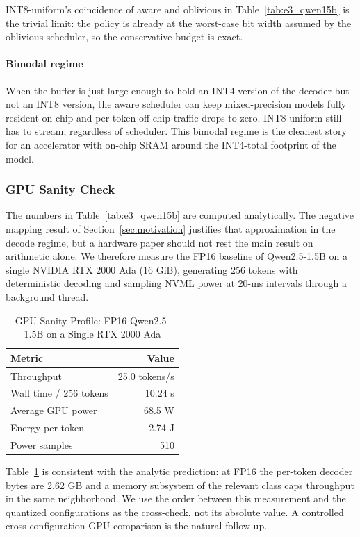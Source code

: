 \documentclass{ieeeaccess}
\begin{document}
INT8-uniform's coincidence of aware and oblivious in
Table~\ref{tab:e3_qwen15b} is the trivial limit: the policy is already
at the worst-case bit width assumed by the oblivious scheduler, so the
conservative budget is exact.

\paragraph{Bimodal regime}
When the buffer is just large enough to hold an INT4 version of the
decoder but not an INT8 version, the aware scheduler can keep
mixed-precision models fully resident on chip and per-token off-chip
traffic drops to zero. INT8-uniform still has to stream, regardless of
scheduler. This bimodal regime is the cleanest story for an
accelerator with on-chip SRAM around the INT4-total footprint of the
model.

\subsubsection{GPU Sanity Check}
The numbers in Table~\ref{tab:e3_qwen15b} are computed analytically.
The negative mapping result of Section~\ref{sec:motivation} justifies
that approximation in the decode regime, but a hardware paper should
not rest the main result on arithmetic alone. We therefore measure the
FP16 baseline of Qwen2.5-1.5B on a single NVIDIA RTX 2000 Ada (16 GiB),
generating 256 tokens with deterministic decoding and sampling NVML
power at 20-ms intervals through a background thread.

\begin{table}[t]
\caption{GPU Sanity Profile: FP16 Qwen2.5-1.5B on a Single RTX 2000 Ada}
\label{tab:gpu_profile}
\centering
\begin{tabular}{lr}
\toprule
Metric & Value \\
\midrule
Throughput & 25.0 tokens/s \\
Wall time / 256 tokens & 10.24 s \\
Average GPU power & 68.5 W \\
Energy per token & 2.74 J \\
Power samples & 510 \\
\bottomrule
\end{tabular}
\end{table}

Table~\ref{tab:gpu_profile} is consistent with the analytic prediction:
at FP16 the per-token decoder bytes are 2.62 GB and a memory subsystem
of the relevant class caps throughput in the same neighborhood. We use
the order between this measurement and the quantized configurations as
the cross-check, not its absolute value. A controlled cross-configuration
GPU comparison is the natural follow-up.
\end{document}
